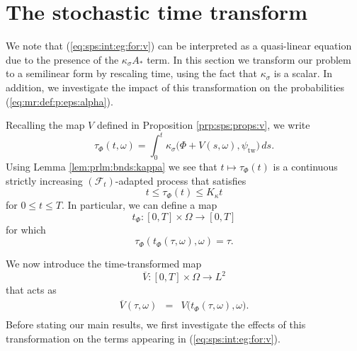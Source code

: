 \documentclass[10pt]{articleHJ}
\newcommand{\sref}[1]{(\ref{#1})}                       %
\numberwithin{equation}{section}
\begin{document}
\section{The stochastic time transform}
\label{sec:md}

We note that \sref{eq:sps:int:eg:for:v}
can be interpreted as a quasi-linear
equation due to the presence
of the $\kappa_{\sigma} A_*$ term.
In this section we transform
our problem to a semilinear form
by rescaling time, using the fact that
$\kappa_{\sigma}$ is a scalar.
In addition, we investigate
the impact of this transformation
on the probabilities \sref{eq:mr:def:p:eps:alpha}.


Recalling the map $V$
defined in Proposition
\ref{prp:sps:props:v},
we write
\begin{equation}
\tau_\Phi(t, \omega) = \int_0^t
  \kappa_{\sigma}\big( \Phi + V(s, \omega) , \psi_{\mathrm{tw}} \big)  \, d s .
\end{equation}
Using Lemma \ref{lem:prlm:bnds:kappa}
we see that
$t \mapsto \tau_\Phi(t)$ is a continuous
strictly increasing $(\mathcal{F}_t)$-adapted
process that satisfies
\begin{equation}
\label{eq:mild:ineqs:tau:phi}
t \le \tau_\Phi(t) \le K_{\kappa} t
\end{equation}
for $0 \le t \le T$.
In particular, we can define a map
\begin{equation}
\label{eq:mild:defn:t:phi:spaces}
t_{\Phi}: [0, T] \times \Omega \to [0, T]
\end{equation}
for which
\begin{equation}
\label{eq:mild:defn:t:phi}
\tau_{\Phi}(t_{\Phi}(\tau, \omega), \omega) = \tau.
\end{equation}


We now introduce the
time-transformed map
\begin{equation}
\overline{V}: [0,T] \times \Omega \to L^2
\end{equation}
that acts as
\begin{equation}
\label{eq:mld:def:ovl:v}
\begin{array}{lcl}
\overline{V}(\tau, \omega)
& = & V\big( t_\Phi(\tau, \omega) , \omega \big) .
\\[0.2cm]
\end{array}
\end{equation}
Before stating our main results,
we first investigate
the effects of this transformation
on the terms appearing in
\sref{eq:sps:int:eg:for:v}.
\end{document}
